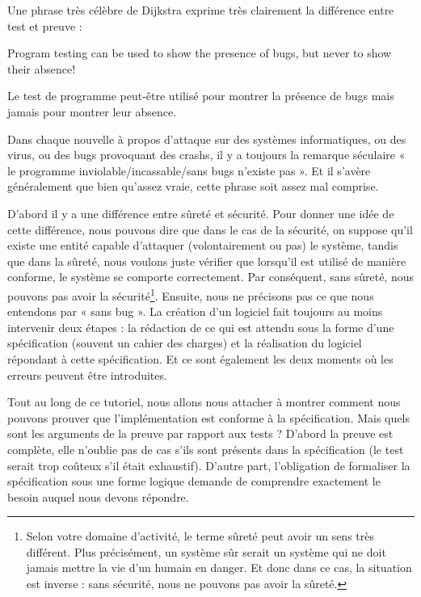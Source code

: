 Une phrase très célèbre de Dijkstra exprime très clairement la différence entre
test et preuve :



\begin{Quotation}[Dijkstra]
Program testing can be used to show the presence of bugs, but never to show 
their absence!
\end{Quotation}



Le test de programme peut-être utilisé pour montrer la présence de bugs mais 
jamais pour montrer leur absence.





Dans chaque nouvelle à propos d'attaque sur des systèmes informatiques, ou 
des virus, ou des bugs provoquant des crashs, il y a toujours la remarque 
séculaire « le programme inviolable/incassable/sans bugs n'existe pas ». Et 
il s'avère généralement que bien qu'assez vraie, cette phrase soit assez 
mal comprise.



D'abord il y a une différence entre sûreté et sécurité. Pour donner une
idée de cette différence, nous pouvons dire que dans le cas de la sécurité,
on suppose qu'il existe une entité capable d'attaquer (volontairement ou
pas) le système, tandis que dans la sûreté, nous voulons juste vérifier que
lorsqu'il est utilisé de manière conforme, le système se comporte
correctement. Par conséquent, sans sûreté, nous pouvons pas avoir la
sécurité\footnote{Selon votre domaine d'activité, le terme sûreté peut
avoir un sens très différent. Plus précisément, un système sûr serait un
système qui ne doit jamais mettre la vie d'un humain en danger. Et donc
dans ce cas, la situation est inverse : sans sécurité, nous ne pouvons pas
avoir la sûreté.}. Ensuite, nous ne 
précisons pas ce que nous entendons par « sans bug ». La création d'un logiciel
fait toujours au moins intervenir deux étapes : la rédaction de ce qui est
attendu sous la forme d'une spécification (souvent un cahier des charges) 
et la réalisation du logiciel répondant à cette spécification. Et ce sont 
également les deux moments où les erreurs peuvent être introduites.



Tout au long de ce tutoriel, nous allons nous attacher à montrer comment nous 
pouvons prouver que l'implémentation est conforme à la spécification. Mais 
quels sont les arguments de la preuve par rapport aux tests ? D'abord la preuve
est complète, elle n'oublie pas de cas s'ils sont présents dans la spécification 
(le test serait trop coûteux s'il était exhaustif). D'autre part, l'obligation 
de formaliser la spécification sous une forme logique demande de comprendre 
exactement le besoin auquel nous devons répondre.



